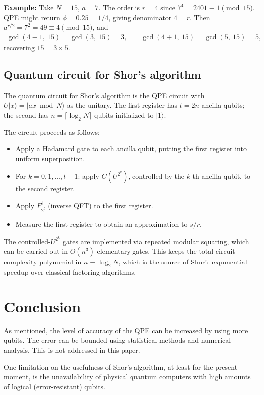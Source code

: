 \documentclass[11pt]{article}
\begin{document}
\textbf{Example:} Take $N = 15$, $a = 7$. The order is $r = 4$ since $7^4 = 2401 \equiv 1 \pmod{15}$. QPE might return $\phi = 0.25 = 1/4$, giving denominator $4 = r$. Then $a^{r/2} = 7^2 = 49 \equiv 4 \pmod{15}$, and
\begin{align*}
\gcd(4 - 1,\ 15) = \gcd(3,\ 15) = 3, \qquad \gcd(4 + 1,\ 15) = \gcd(5,\ 15) = 5,
\end{align*}
recovering $15 = 3 \times 5$.

\subsection{Quantum circuit for Shor's algorithm}

The quantum circuit for Shor's algorithm is the QPE circuit with $U\vert x\rangle = \vert ax \bmod N\rangle$ as the unitary. The first register has $t = 2n$ ancilla qubits; the second has $n = \lceil \log_2 N \rceil$ qubits initialized to $\vert 1 \rangle$.

The circuit proceeds as follows:
\begin{itemize}
    \item Apply a Hadamard gate to each ancilla qubit, putting the first register into uniform superposition.
    \item For $k = 0, 1, \ldots, t-1$: apply $C(U^{2^k})$, controlled by the $k$-th ancilla qubit, to the second register.
    \item Apply $F_{2^t}^\dagger$ (inverse QFT) to the first register.
    \item Measure the first register to obtain an approximation to $s/r$.
\end{itemize}

The controlled-$U^{2^k}$ gates are implemented via repeated modular squaring, which can be carried out in $O(n^3)$ elementary gates. This keeps the total circuit complexity polynomial in $n = \log_2 N$, which is the source of Shor's exponential speedup over classical factoring algorithms.

\section{Conclusion}

As mentioned, the level of accuracy of the QPE can be increased by using more qubits. The error can be bounded using statistical methods and numerical analysis. This is not addressed in this paper.

One limitation on the usefulness of Shor's algorithm, at least for the present moment, is the unavailability of physical quantum computers with high amounts of logical (error-resistant) qubits.




\end{document}
